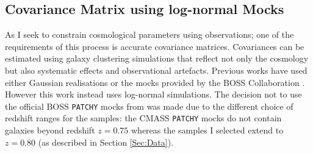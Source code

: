 \subsection{Covariance Matrix using log-normal Mocks}\label{Sec:Cov}
As I seek to constrain cosmological parameters using observations; one of the requirements of this process is accurate covariance matrices. Covariances can be estimated using galaxy clustering simulations that reflect not only the cosmology but also systematic effects and observational artefacts. Previous works have used either Gaussian realisations \citep{Blake2007,Thomas2011,2016Nicola} or the mocks provided by the BOSS Collaboration \citep{2016BOSSMocks,Manera2013}. However this work instead uses log-normal simulations. The decision not to use the official BOSS \texttt{PATCHY} mocks from \cite{2016BOSSMocks} was made due to the different choice of redshift ranges for the samples: the CMASS \texttt{PATCHY} mocks do not contain galaxies beyond redshift $z = 0.75$ whereas the samples I selected extend to $z = 0.80$ (as described in Section \ref{Sec:Data}). 


